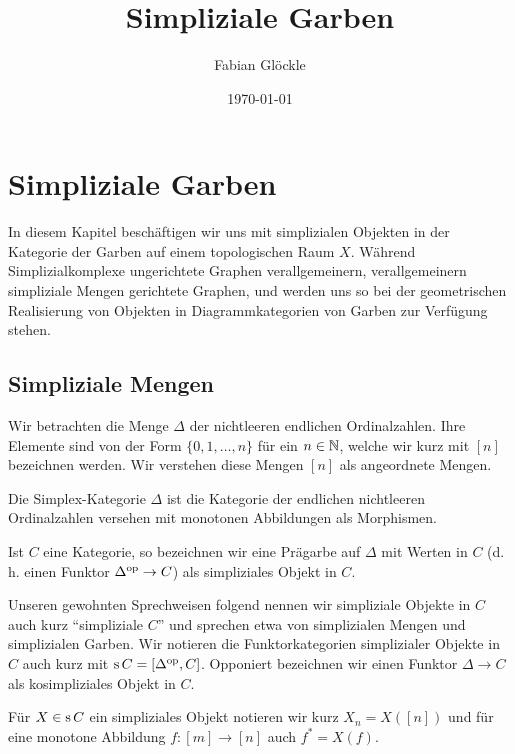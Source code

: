 



\title{Simpliziale Garben}
\author{Fabian Glöckle}
\date{\today}

\chapter{Simpliziale Garben}

In diesem Kapitel beschäftigen wir uns mit simplizialen Objekten in
der Kategorie der Garben auf einem topologischen Raum $X$. Während
Simplizialkomplexe ungerichtete Graphen verallgemeinern,
verallgemeinern simpliziale Mengen gerichtete Graphen, und werden uns
so bei der geometrischen Realisierung von Objekten in
Diagrammkategorien von Garben zur Verfügung stehen.

\section{Simpliziale Mengen}

Wir betrachten die Menge $\Delta$ der nichtleeren endlichen
Ordinalzahlen. Ihre Elemente sind von der Form $\{0, 1, \dots, n\}$
für ein $n \in \mathbb{N}$, welche wir kurz mit $[n]$ bezeichnen werden. Wir
verstehen diese Mengen $[n]$ als angeordnete Mengen.

\begin{defn} \label{def:delta}
  Die Simplex-Kategorie $\Delta$ ist die Kategorie der endlichen
  nichtleeren Ordinalzahlen versehen mit monotonen Abbildungen als
  Morphismen.

  Ist $C$ eine Kategorie, so bezeichnen wir eine Prägarbe auf $\Delta$
  mit Werten in $C$ (d. h. einen Funktor $\Delta^\mathrm{op} \to C$) als
  simpliziales Objekt in $C$.
\end{defn}

Unseren gewohnten Sprechweisen folgend nennen wir simpliziale Objekte
in $C$ auch kurz ``simpliziale $C$'' und sprechen etwa von
simplizialen Mengen und simplizialen Garben. Wir notieren die
Funktorkategorien simplizialer Objekte in $C$ auch kurz mit $\operatorname{s} C =
[\Delta^\mathrm{op}, C]$. Opponiert bezeichnen wir einen Funktor $\Delta \to C$
als kosimpliziales Objekt in $C$.

Für $X \in \operatorname{s} C$ ein simpliziales Objekt notieren wir kurz $X_n =
X([n])$ und für eine monotone Abbildung $f: [m] \to [n]$ auch $f^* =
X(f)$.

